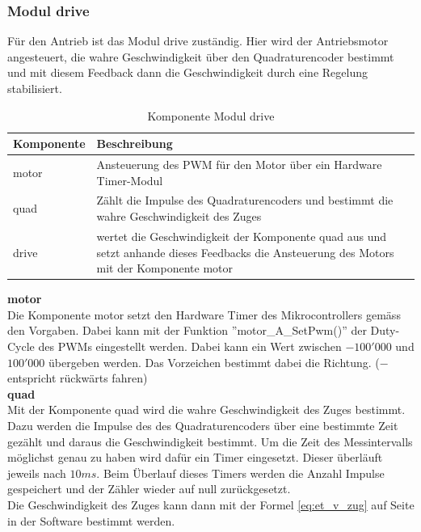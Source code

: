\documentclass[../../main.tex]{subfiles}
\begin{document}
    \subsubsection{Modul drive}
    Für den Antrieb ist das Modul drive zuständig. Hier wird der Antriebsmotor angesteuert, die wahre Geschwindigkeit über den Quadraturencoder bestimmt und mit diesem Feedback dann die Geschwindigkeit durch eine Regelung stabilisiert.\\

    \begin{table}[H]
        \centering
        \begin{tabular}{|l|p{12cm}|}
        \hline
        \textbf{Komponente} & \textbf{Beschreibung}    \\ \hline
        motor  & Ansteuerung des PWM für den Motor über ein Hardware Timer-Modul \\ \hline
        quad   & Zählt die Impulse des Quadraturencoders und bestimmt die wahre Geschwindigkeit des Zuges \\ \hline
        drive  & wertet die Geschwindigkeit der Komponente quad aus und setzt anhande dieses Feedbacks die Ansteuerung des Motors mit der Komponente motor \\ \hline
        \end{tabular}
        \caption{Komponente Modul drive}
        \label{tab:et_mc_drive}
    \end{table}

    \textbf{motor}\\
    Die Komponente motor setzt den Hardware Timer des Mikrocontrollers gemäss den Vorgaben. Dabei kann mit der Funktion ''motor\_A\_SetPwm()'' der Duty-Cycle des PWMs eingestellt werden. Dabei kann ein Wert zwischen  $-100'000$ und $100'000$ übergeben werden. Das Vorzeichen bestimmt dabei die Richtung. ($-$ entspricht rückwärts fahren)\\

    \textbf{quad}\\
    Mit der Komponente quad wird die wahre Geschwindigkeit des Zuges bestimmt. Dazu werden die Impulse des des Quadraturencoders über eine bestimmte Zeit gezählt und daraus die Geschwindigkeit bestimmt. Um die Zeit des Messintervalls möglichst genau zu haben wird dafür ein Timer eingesetzt. Dieser überläuft jeweils nach $10 ms$. Beim Überlauf dieses Timers werden die Anzahl Impulse gespeichert und der Zähler wieder auf null zurückgesetzt.\\
    Die Geschwindigkeit des Zuges kann dann mit der Formel \ref{eq:et_v_zug} auf Seite \pageref{eq:et_v_zug} in der Software bestimmt werden.
\end{document}
